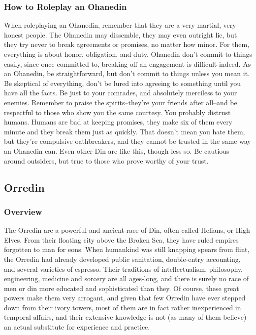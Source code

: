 \documentclass[oneside,11pt,english]{book}
\begin{document}
\subsubsection{How to Roleplay an Ohanedin}
When roleplaying an Ohanedin, remember that they are a very martial, very honest people. The Ohanedin 
may dissemble, they may even outright lie, but they try never to break agreements or promises, no matter 
how minor. For them, everything is about honor, obligation, and duty. Ohanedin don’t commit to things 
easily, since once committed to, breaking off an engagement is difficult indeed. As an Ohanedin, be 
straightforward, but don’t commit to things unless you mean it. Be skeptical of everything, don’t be lured 
into agreeing to something until you have all the facts. Be just to your comrades, and absolutely merciless 
to your enemies. Remember to praise the spirits--they’re your friends after all--and be respectful to those 
who show you the same courtesy. You probably distrust humans. Humans are bad at keeping promises, 
they make six of them every minute and they break them just as quickly. That doesn’t mean you hate 
them, but they’re compulsive oathbreakers, and they cannot be trusted in the same way an Ohanedin can. 
Even other Din are like this, though less so. Be cautious around outsiders, but true to those who prove 
worthy of your trust. 
\subsection{Orredin}
\subsubsection*{Overview} 
The Orredin are a powerful and ancient race of Din, often called Helians, or High Elves. From their 
floating city above the Broken Sea, they have ruled empires forgotten to man for eons. When humankind 
was still knapping spears from flint, the Orredin had already developed public sanitation, double-entry 
accounting, and several varieties of espresso. Their traditions of intellectualism, philosophy, engineering, 
medicine and sorcery are all ages-long, and there is surely no race of men or din more educated and sophisticated than they. 
Of course, these great powers make them very arrogant, and given that few Orredin have ever stepped 
down from their ivory towers, most of them are in fact rather inexperienced in temporal affairs, and their 
extensive knowledge is not (as many of them believe) an actual substitute for experience and practice. 
\end{document}
